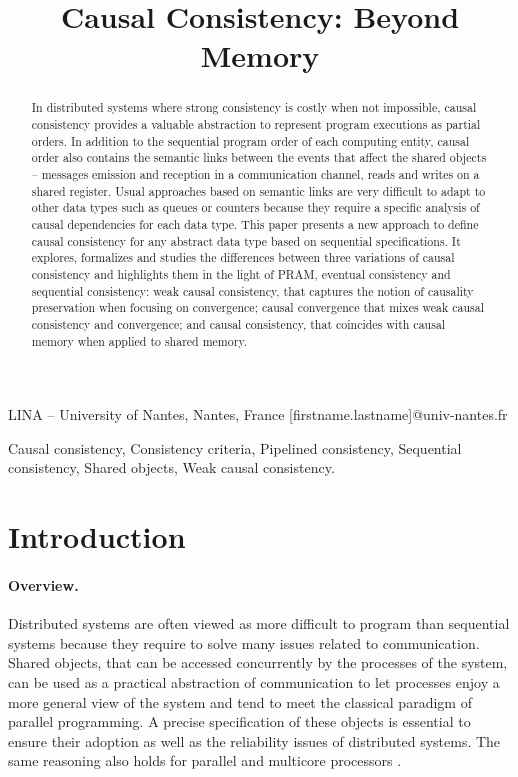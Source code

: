 \documentclass[9pt,numbers]{sigplanconf}
\begin{document}
\title{Causal Consistency: Beyond Memory}

           {LINA -- University of Nantes, Nantes, France}
           {[firstname.lastname]@univ-nantes.fr}

\maketitle

\begin{abstract}
In distributed systems where strong consistency is costly when not impossible, causal consistency provides a valuable abstraction to represent program executions as partial orders. In addition to the sequential program order of each computing entity, causal order also contains the semantic links between the events that affect the shared objects -- messages emission and reception in a communication channel, reads and writes on a shared register. Usual approaches based on semantic links are very difficult to adapt to other data types such as queues or counters because they require a specific analysis of causal dependencies for each data type. This paper presents a new approach to define causal consistency for any abstract data type based on sequential specifications. It explores, formalizes and studies the differences between three variations of causal consistency and highlights them in the light of PRAM, eventual consistency and sequential consistency: weak causal consistency, that captures the notion of causality preservation when focusing on convergence; causal convergence that mixes weak causal consistency and convergence; and causal consistency, that coincides with causal memory when applied to shared memory.
\end{abstract}


\keywords
  Causal consistency, Consistency criteria,
  Pipelined consistency, Sequential consistency, Shared objects, 
  Weak causal consistency.

\section{Introduction}


\paragraph{Overview.}
Distributed systems are often viewed as more difficult to program than sequential systems 
because they require to solve many issues related to communication. Shared objects, that can be
accessed concurrently by the processes of the system, can be used as a practical abstraction
of communication to let processes enjoy a more general view of the system and tend to meet the classical paradigm of parallel programming. A precise specification of these objects is essential to ensure their adoption as well as the reliability issues of distributed systems. The same reasoning also holds for parallel and multicore processors \cite{BA08,SVNJS11}.
\end{document}
